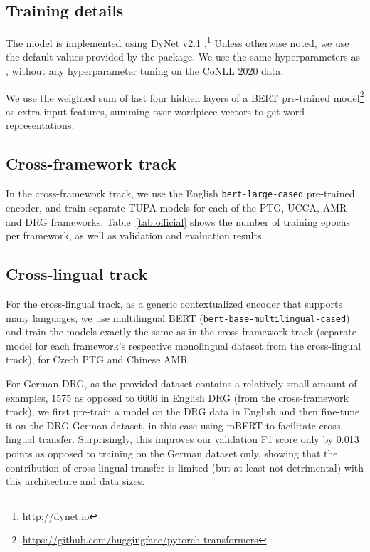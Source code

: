 \documentclass[11pt,a4paper]{article}
\begin{document}
\subsection{Training details}\label{sec:tupa-training}

The model is implemented using DyNet v2.1
\cite{neubig2017dynet}.\footnote{\url{http://dynet.io}}
Unless otherwise noted, we use the default values provided by the package.
We use the same hyperparameters as ,
without any hyperparameter tuning on the CoNLL 2020 data.

We use the weighted sum of last four hidden layers of a BERT \cite{devlin-etal-2019-bert} pre-trained model\footnote{\url{https://github.com/huggingface/pytorch-transformers}} as extra input features,
summing over wordpiece vectors to get word representations.

\subsection{Cross-framework track}\label{sec:tupa-cf}
In the cross-framework track, we use the English \texttt{bert-large-cased} pre-trained encoder, and train separate TUPA models for each of the PTG, UCCA, AMR and DRG frameworks. Table~\ref{tab:official} shows the number of training epochs per framework, as well as validation and evaluation results.

\subsection{Cross-lingual track}\label{sec:tupa-cl}
For the cross-lingual track, as a generic contextualized encoder that supports many languages, we use multilingual BERT (\texttt{bert-base-multilingual-cased}) and train the models exactly the same as in the cross-framework track (separate model for each framework's respective monolingual dataset from the cross-lingual track), for Czech PTG and Chinese AMR.

For German DRG, as the provided dataset contains a relatively small amount of examples, 1575 as opposed to 6606 in English DRG (from the cross-framework track), we first pre-train a model on the DRG data in English and then fine-tune it on the DRG German dataset, in this case using mBERT to facilitate cross-lingual transfer. Surprisingly, this improves  our validation F1 score only by 0.013 points as opposed to training on the German dataset only, showing that the contribution of cross-lingual transfer is limited (but at least not detrimental) with this architecture and data sizes.
\end{document}
